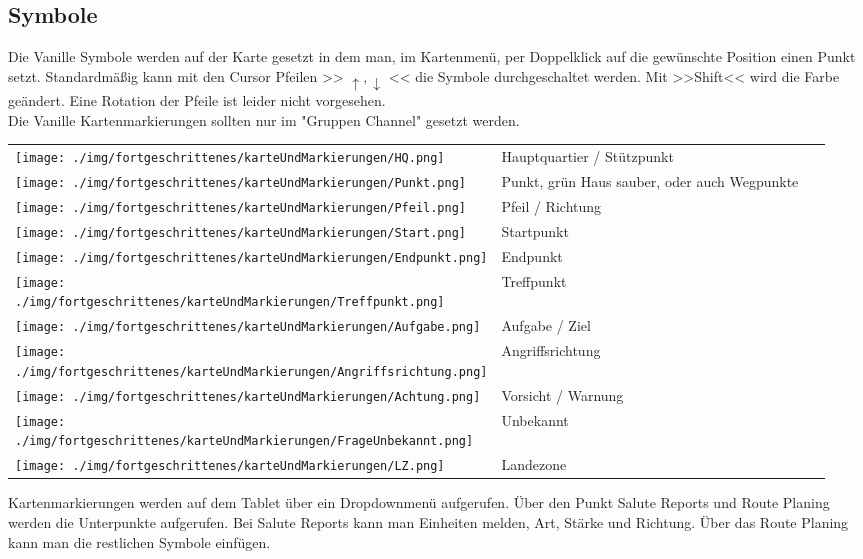 \pagebreak
\subsection{Symbole}
Die Vanille Symbole werden auf der Karte gesetzt in dem man, im Kartenmenü, per Doppelklick auf die gewünschte Position einen Punkt setzt. Standardmäßig kann mit den Cursor Pfeilen >> \begin{math} \uparrow,\downarrow \end{math} << die Symbole durchgeschaltet werden. Mit >>Shift<< wird die Farbe geändert. Eine Rotation der Pfeile ist leider nicht vorgesehen. \\
Die Vanille Kartenmarkierungen sollten nur im "Gruppen Channel" gesetzt werden.

\begin{longtable}{C{0.1\linewidth} m{0.85\linewidth}}
	\texttt{[image: ./img/fortgeschrittenes/karteUndMarkierungen/HQ.png]}	& 	Hauptquartier / Stützpunkt \\
	\texttt{[image: ./img/fortgeschrittenes/karteUndMarkierungen/Punkt.png]}	&	Punkt, grün Haus sauber, oder auch Wegpunkte \\
	\texttt{[image: ./img/fortgeschrittenes/karteUndMarkierungen/Pfeil.png]}	&	Pfeil / Richtung \\
	\texttt{[image: ./img/fortgeschrittenes/karteUndMarkierungen/Start.png]}	&	Startpunkt \\
	\texttt{[image: ./img/fortgeschrittenes/karteUndMarkierungen/Endpunkt.png]}	&	Endpunkt \\
	\texttt{[image: ./img/fortgeschrittenes/karteUndMarkierungen/Treffpunkt.png]}	&	Treffpunkt \\
	\texttt{[image: ./img/fortgeschrittenes/karteUndMarkierungen/Aufgabe.png]}	&	Aufgabe / Ziel \\
	\texttt{[image: ./img/fortgeschrittenes/karteUndMarkierungen/Angriffsrichtung.png]}	& 	Angriffsrichtung \\
	\texttt{[image: ./img/fortgeschrittenes/karteUndMarkierungen/Achtung.png]}	&	Vorsicht / Warnung \\
	\texttt{[image: ./img/fortgeschrittenes/karteUndMarkierungen/FrageUnbekannt.png]}	& 	Unbekannt \\
	\texttt{[image: ./img/fortgeschrittenes/karteUndMarkierungen/LZ.png]}	&	Landezone
\end{longtable}

\newpage
Kartenmarkierungen werden auf dem Tablet über ein Dropdownmenü aufgerufen. Über den Punkt Salute Reports und Route Planing werden die Unterpunkte aufgerufen. Bei Salute Reports kann man Einheiten melden, Art, Stärke und Richtung. Über das Route Planing kann man die restlichen Symbole einfügen.

